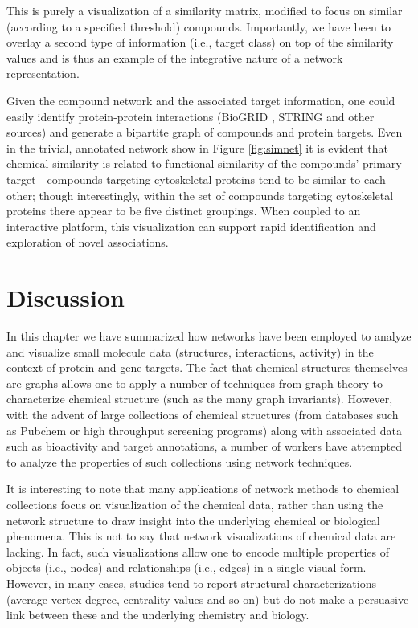 \documentclass[]{book}
\begin{document}
This is purely a visualization of a similarity matrix,
modified to focus on similar (according to a specified threshold)
compounds. Importantly, we have been to overlay a second type of
information (i.e., target class) on top of the similarity values and
is thus an example of the integrative nature of a network
representation.

Given the compound network and the associated target information, one
could easily identify protein-protein interactions (BioGRID
\cite{Chatr-Aryamontri:2015yf}, STRING \cite{Franceschini:2013qa} and
other sources) and generate a bipartite graph of compounds and protein
targets. Even in the trivial, annotated network show in Figure
\ref{fig:simnet} it is evident that chemical similarity is related to
functional similarity of the compounds' primary target - compounds
targeting cytoskeletal proteins tend to be similar to each other;
though interestingly, within the set of compounds targeting
cytoskeletal proteins there appear to be five distinct groupings. When
coupled to an interactive platform, this visualization can support
rapid identification and exploration of novel associations.

\section{Discussion}
\label{sec:summary}

In this chapter we have summarized how networks have been employed to
analyze and visualize small molecule data (structures, interactions,
activity) in the context of protein and gene targets. The fact that
chemical structures themselves are graphs allows one to apply a number
of techniques from graph theory to characterize chemical structure
(such as the many graph invariants). However, with the advent of large
collections of chemical structures (from databases such as Pubchem or
high throughput screening programs) along with associated data such as
bioactivity and target annotations, a number of workers have attempted
to analyze the properties of such collections using network
techniques.

It is interesting to note that many applications of network methods to
chemical collections focus on visualization of the chemical data,
rather than using the network structure to draw insight into the
underlying chemical or biological phenomena. This is not to say that
network visualizations of chemical data are lacking. In fact, such
visualizations allow one to encode multiple properties of objects
(i.e., nodes) and relationships (i.e., edges) in a single visual
form. However, in many cases, studies tend to report structural
characterizations (average vertex degree, centrality values and so on)
but do not make a persuasive link between these and the underlying
chemistry and biology.
\end{document}
